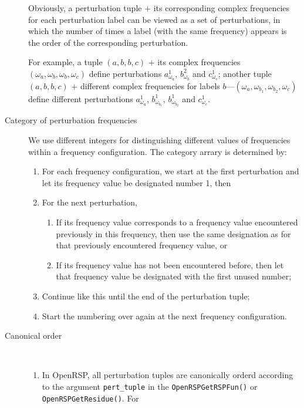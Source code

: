 \begin{description}
    Obviously, a perturbation tuple $+$ its corresponding complex
    frequencies for each perturbation label can be viewed as a set of
    perturbations, in which the number of times a label (with the same
    frequency) appears is the order of the corresponding perturbation.

    For example, a tuple $(a,b,b,c)$ $+$ its complex frequencies
    $(\omega_{a},\omega_{b},\omega_{b},\omega_{c})$ define perturbations
    $a_{\omega_{a}}^{1}$, $b_{\omega_{b}}^{2}$ and $c_{\omega_{c}}^{1}$;
    another tuple $(a,b,b,c)$ $+$ different complex frequencies for labels
    $b$---$(\omega_{a},\omega_{b_{1}},\omega_{b_{2}},\omega_{c})$ define
    different perturbations $a_{\omega_{a}}^{1}$, $b_{\omega_{b_{1}}}^{1}$,
    $b_{\omega_{b_{2}}}^{1}$ and $c_{\omega_{c}}^{1}$.
  \item[Category of perturbation frequencies] We use different integers for
    distinguishing different values of frequencies within a frequency
    configuration. The category arrary is determined by:
    \begin{enumerate}
      \item For each frequency configuration, we start at the first
        perturbation and let its frequency value be designated number 1, then
      \item For the next perturbation,
        \begin{enumerate}
          \item If its frequency value corresponds to a frequency value
            encountered previously in this frequency, then use the same
            designation as for that previously encountered frequency value, or
          \item If its frequency value has not been encountered before, then
            let that frequency value be designated with the first unused
            number;
        \end{enumerate}
      \item Continue like this until the end of the perturbation tuple;
      \item Start the numbering over again at the next frequency configuration.
    \end{enumerate}
  \item[Canonical order]~
    \begin{enumerate}
      \item In OpenRSP, all perturbation tuples are canonically orderd
        according to the argument \texttt{pert\_tuple} in the
        \texttt{OpenRSPGetRSPFun()} or \texttt{OpenRSPGetResidue()}. For

\end{enumerate}
\end{description}
